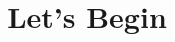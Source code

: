 \documentclass{ximera}
\title{Let's Begin}
\begin{document}
\begin{abstract}
\end{abstract}
\maketitle
\end{document}

